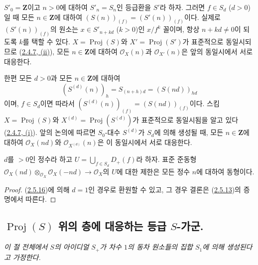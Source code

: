 \begin{env}[2.5.16]
\label{II.2.5.16-ko}
$S'_0=\mathbf{Z}$이고 $n>0$에 대하여 $S'_n=S_n$인 등급환을 $S'$라 하자.
그러면 $f\in S_d$ ($d>0$)일 때 모든 $n\in\mathbf{Z}$에 대하여
$(S(n))_{(f)}=(S'(n))_{(f)}$이다. 실제로 $(S'(n))_{(f)}$의 원소는
$x\in S'_{n+kd}$ ($k>0$)인 $x/f^k$ 꼴이며, 항상 $n+kd\neq0$이 되도록
$k$를 택할 수 있다. $X=\operatorname{Proj}(S)$와
$X'=\operatorname{Proj}(S')$가 표준적으로 동일시되므로
(\hyperref[II.2.4.7-ko]{2.4.7, (ii)}), 모든 $n\in\mathbf{Z}$에 대하여
$\mathcal{O}_X(n)$과 $\mathcal{O}_{X'}(n)$은 앞의 동일시에서 서로
대응한다.

한편 모든 $d>0$과 모든 $n\in\mathbf{Z}$에 대하여
\[
  (S^{(d)}(n))_h=S_{(n+h)d}=(S(nd))_{hd}
\]
이며, $f\in S_d$이면 따라서
$(S^{(d)}(n))_{(f)}=(S(nd))_{(f)}$이다. 스킴
$X=\operatorname{Proj}(S)$와 $X^{(d)}=\operatorname{Proj}(S^{(d)})$가
표준적으로 동일시됨을 알고 있다
(\hyperref[II.2.4.7-ko]{2.4.7, (i)}). 앞의 논의에 따르면 $S_0$-대수
$S^{(d)}$가 $S_d$에 의해 생성될 때, 모든 $n\in\mathbf{Z}$에 대하여
$\mathcal{O}_X(nd)$와 $\mathcal{O}_{X^{(d)}}(n)$은 이 동일시에서 서로
대응한다.
\end{env}

\begin{proposition}[2.5.17]
\label{II.2.5.17-ko}
$d$를 $>0$인 정수라 하고
$U=\bigcup_{f\in S_d}D_+(f)$라 하자. 표준 준동형
$\mathcal{O}_X(nd)\otimes_{\mathcal{O}_X}\mathcal{O}_X(-nd)
\to\mathcal{O}_X$의 $U$에 대한 제한은 모든 정수 $n$에 대하여
동형이다.
\end{proposition}

\begin{proof}
(\hyperref[II.2.5.16-ko]{2.5.16})에 의해 $d=1$인 경우로 환원할 수 있고,
그 경우 결론은 (\hyperref[II.2.5.13-ko]{2.5.13})의 증명에서 따른다.
\end{proof}

\subsection{$\operatorname{Proj}(S)$ 위의 층에 대응하는 등급
$S$-가군.}
\label{subsection:II.2.6-ko}

\emph{이 절 전체에서 $S$의 아이디얼 $S_+$가 차수 $1$의 동차 원소들의
집합 $S_1$에 의해 생성된다고 가정한다.}

